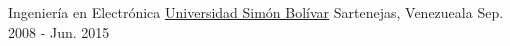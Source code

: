 \begin{cventries}
  \cventry
    {Ingeniería en Electrónica}
    {\href{http://www.usb.ve/}{Universidad Simón Bolívar}}
    {Sartenejas, Venezueala}
    {Sep. 2008 - Jun. 2015}{}
    \vspace*{-4mm}
\end{cventries}